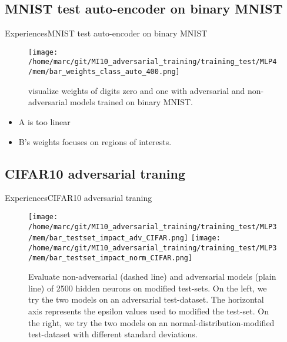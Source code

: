 \documentclass[10pt]{beamer}
\begin{document}
\subsection{MNIST test auto-encoder on binary MNIST}
\begin{frame}{Experiences}{MNIST test auto-encoder on binary MNIST}
  \begin{figure}
    \centering
    \texttt{[image: /home/marc/git/MI10\_adversarial\_training/training\_test/MLP4/mem/bar\_weights\_class\_auto\_400.png]}
    \caption{visualize weights of digits zero and one with adversarial and non-adversarial models trained on binary MNIST.}
    \label{fig:mnist_bin_weight_class}
  \end{figure}
  \pause
  \begin{itemize}
    \item A is too linear
    \item B's weights focuses on regions of interests.
  \end{itemize}
\end{frame}

\subsection{CIFAR10 adversarial traning}
\begin{frame}{Experiences}{CIFAR10 adversarial traning}
  \pause
  \begin{figure}
    \centering
    \texttt{[image: /home/marc/git/MI10\_adversarial\_training/training\_test/MLP3/mem/bar\_testset\_impact\_adv\_CIFAR.png]}
    \texttt{[image: /home/marc/git/MI10\_adversarial\_training/training\_test/MLP3/mem/bar\_testset\_impact\_norm\_CIFAR.png]}
    \caption{Evaluate non-adversarial (dashed line) and adversarial models (plain line) of 2500 hidden neurons on modified test-sets. On the left, we try the two models on an adversarial test-dataset. The horizontal axis represents the epsilon values used to modified the test-set. On the right, we try the two models on an normal-distribution-modified test-dataset with different standard deviations.}
    \label{fig:cifar_noisy_test}
  \end{figure}
\end{frame}
\end{document}

